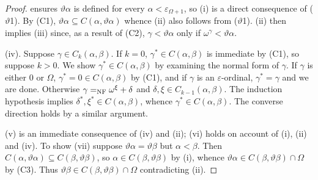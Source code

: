 \documentclass[UKenglish,cleveref,DIV=12]{scrartcl}
\theoremstyle{definition}
\theoremstyle{definition}
\newcommand{\gelhighlight}[1]{\highlight[magenta]{#1}}
\begin{document}
\begin{proof}\gelhighlight{Update numbering}
 ensures $\vartheta\alpha$ is defined for every
$\alpha<\varepsilon_{\Omega+1}$, so (i) is a direct consequence of ($\vartheta$1). By (C1),
$\vartheta\alpha\subseteq C(\alpha,\vartheta\alpha)$ whence (ii) also follows
from ($\vartheta$1). (ii) then implies (iii) since, as a result of (C2),
$\gamma<\vartheta\alpha$ only if $\omega^\gamma<\vartheta\alpha$.

(iv). Suppose $\gamma\in C_k(\alpha,\beta)$. If $k=0$, $\gamma^*\in C(\alpha,\beta)$ is immediate by (C1), so suppose $k>0$.
We show $\gamma^*\in C(\alpha,\beta)$ by
examining the normal form of $\gamma$. If $\gamma$ is either $0$ or $\Omega$,
$\gamma^*=0\in C(\alpha,\beta)$ by (C1), and if $\gamma$ is an $\varepsilon$-ordinal,
$\gamma^*=\gamma$ and we are done. Otherwise
$\gamma=_{\mathrm{NF}}\omega^{\xi}+\delta$ and $\delta,\xi\in C_{k-1}(\alpha,\beta)$. The
induction hypothesis implies $\delta^*,\xi^*\in C(\alpha,\beta)$, whence
$\gamma^*\in C(\alpha,\beta)$. The converse direction holds by a similar argument.

(v) is an immediate consequence of (iv) and (ii); (vi) holds on account of (i),
(ii) and (iv). To show (vii) suppose $\vartheta\alpha=\vartheta\beta$ but
$\alpha<\beta$. Then $C(\alpha,\vartheta\alpha)\subseteq
C(\beta,\vartheta\beta)$, so $\alpha\in C(\beta,\vartheta\beta)$ by (i), whence
$\vartheta\alpha\in C(\beta,\vartheta\beta)\cap\Omega$ by (C3). Thus
$\vartheta\beta\in C(\beta,\vartheta\beta)\cap\Omega$ contradicting (ii).


\end{proof}
\end{document}
